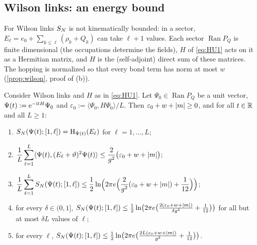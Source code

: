 \subsection{Wilson links: an energy bound}\label{sec:u1:wilson}

For Wilson links $S_{N}$ is not kinematically bounded: in a sector, $E_\ell=e_0+\sum_{k\le\ell}(\rho_k+Q_k)$ can take
$\ell+1$ values.  Each sector $\operatorname{Ran}P_Q$ is finite dimensional (the occupations determine the
fields), $H$ of \eqref{eq:HU1} acts on it as a Hermitian matrix, and $H$ is the (self-adjoint) direct sum of
these matrices.  The hopping is normalized so that every bond term has norm at most $w$
(\cref{prop:wilson}, proof of (b)).

\begin{proposition}\label{prop:wilson}
Consider Wilson links and $H$ as in \eqref{eq:HU1}.  Let $\Psi_0\in\operatorname{Ran}P_Q$ be a unit vector,
$\Psi(t):=\mathrm{e}^{-\mathrm{i} tH}\Psi_0$ and $\varepsilon_0:=\langle\Psi_0,H\Psi_0\rangle/L$.  Then
$\varepsilon_0+w+\left|m\right|\ge0$, and for all $t\in\mathbb{R}$ and all $L\ge1$:
\begin{enumerate}[label=(\alph*)]
\item $S_{N}(\Psi(t);[1,\ell])=\mathrm{H}_{\Psi(t)}(E_\ell)$ for $\ell=1,\dots,L$;
\item $\displaystyle\frac1L\sum_{\ell=1}^L\langle\Psi(t),(E_\ell+\vartheta)^2\Psi(t)\rangle\le\frac2{g^2}\bigl(\varepsilon_0+w+\left|m\right|\bigr)$;
\item $\displaystyle\frac1L\sum_{\ell=1}^LS_{N}(\Psi(t);[1,\ell])\le\frac12\ln\Bigl(2\pi e\Bigl(\frac2{g^2}(\varepsilon_0+w+\left|m\right|)+\frac1{12}\Bigr)\Bigr)$;
\item for every $\delta\in(0,1]$, $S_{N}(\Psi(t);[1,\ell])\le\frac12\ln\bigl(2\pi e\bigl(\frac{2(\varepsilon_0+w+\left|m\right|)}{\delta g^2}+\frac1{12}\bigr)\bigr)$
for all but at most $\delta L$ values of $\ell$;
\item for every $\ell$, $S_{N}(\Psi(t);[1,\ell])\le\frac12\ln\bigl(2\pi e\bigl(\frac{2L(\varepsilon_0+w+\left|m\right|)}{g^2}+\frac1{12}\bigr)\bigr)$.
\end{enumerate}
\end{proposition}

